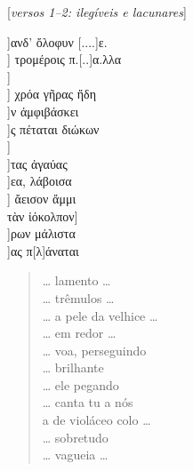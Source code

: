 \begin{gkverse}
\textnormal{[\emph{versos 1--2: ilegíveis e lacunares}]}

]ανδ’ ὄλοφυν [....]ε.\\
] τρομέροις π.[..]α.λλα\\
]\\
  ] χρόα γῆρας ἤδη\\
   ]ν ἀμφιβάσκει\\
     ]ς πέταται διώκων\\
     ]\\
     ]τας ἀγαύας\\
   ]εα, λάβοισα\\
   ] ἄεισον ἄμμι\\
τὰν ἰόκολπον\qquad         ]\\
        ]ρων μάλιστα\\
         ]ας π[λ]άναται
\end{gkverse}


\begin{verse}
\ldots{} lamento \ldots{}\\
\ldots{} trêmulos \ldots{}\\
\ldots{} a pele da velhice \ldots{}\\
\ldots{} em redor \ldots{}\\
\ldots{} voa, perseguindo\\
\ldots{} brilhante\\
\ldots{} ele pegando\\
\ldots{} canta tu a nós\\
a de violáceo colo \ldots{}\\
\ldots{} sobretudo\\
\ldots{} vagueia \ldots{}
\end{verse}

\medskip

